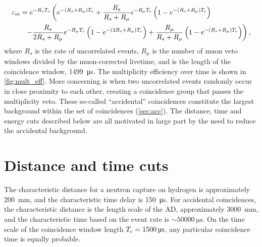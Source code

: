 \begin{align}
    \label{eq:mult_eff}
    \begin{split}
        \varepsilon_m &= e^{-R_s T_c}
        \left(
            e^{-(R_s + R_\mu)T_c} +
            \frac{R_s}{R_s+R_\mu} e^{-R_\mu T_c}
            \left(
                1 - e^{-(R_s + R_\mu)T_c}
            \right)
        \right. \\
              &\ \ \left. - \frac{R_s}{2R_s + R_\mu} e^{-R_\mu T_c}
                  \left(
                      1 - e^{-(2R_s + R_\mu)T_c}
                  \right) +
                  \frac{R_\mu}{R_s + R_\mu}
                  \left(
                      1 - e^{-(R_s + R_\mu)T_c}
                  \right)
              \right),
    \end{split}
\end{align}
where $R_s$ is the rate of uncorrelated events,
$R_\mu$ is the number of muon veto windows divided by the muon-corrected livetime,
and \tc{} is the length of the coincidence window, \SI{1499}{\us}.
The multiplicity efficiency over time is shown in \cref{fig:mult_eff}.
More concerning is when two uncorrelated events
randomly occur in close proximity to each other,
creating a  coincidence group that passes the multiplicity veto.
These so-called ``accidental'' coincidences
constitute the largest background within the set of  coincidences
(\cref{sec:acc}).
The distance, time and energy cuts described below
are all motivated in large part by the need to reduce the accidental background.

\section{Distance and time cuts}
\label{sec:DT_cut}

The characteristic distance for a neutron capture on hydrogen
is approximately \SI{200}{\milli\meter},
and the characteristic time delay is \SI{150}{\us}.
For accidental coincidences, the characteristic distance is
the length scale of the AD, approximately \SI{3000}{\milli\meter},
and the characteristic time based on the  event rate
is $\sim\SI{50000}{\us}$.
On the time scale of the coincidence window length $\tc=\SI{1500}{\us}$,
any particular coincidence time is equally probable.


